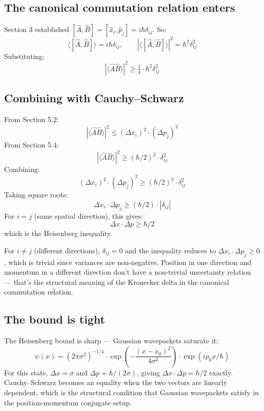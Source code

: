 \documentclass[11pt,a4paper]{article}
\begin{document}
\subsection{The canonical commutation relation enters}

Section 3 established $[\hat{A}, \hat{B}] = [\hat{x}_i, \hat{p}_j] = i\hbar\delta_{ij}$. So:
\[
\langle[\hat{A}, \hat{B}]\rangle = i\hbar\delta_{ij}, \qquad |\langle[\hat{A}, \hat{B}]\rangle|^{2} = \hbar^{2}\delta_{ij}^{2}
\]
Substituting:
\[
|\langle\hat{A}\hat{B}\rangle|^{2} \geq \tfrac{1}{4}\cdot\hbar^{2}\delta_{ij}^{2}
\]

\subsection{Combining with Cauchy--Schwarz}

From Section 5.2:
\[
|\langle\hat{A}\hat{B}\rangle|^{2} \leq (\Delta x_i)^{2}\cdot(\Delta p_j)^{2}
\]
From Section 5.4:
\[
|\langle\hat{A}\hat{B}\rangle|^{2} \geq (\hbar/2)^{2}\cdot\delta_{ij}^{2}
\]
Combining:
\[
(\Delta x_i)^{2}\cdot(\Delta p_j)^{2} \geq (\hbar/2)^{2}\cdot\delta_{ij}^{2}
\]
Taking square roots:
\[
\Delta x_i\cdot\Delta p_j \geq (\hbar/2)\cdot|\delta_{ij}|
\]
For $i = j$ (same spatial direction), this gives:
\[
\Delta x\cdot\Delta p \geq \hbar/2
\]
which is the Heisenberg inequality.

For $i \neq j$ (different directions), $\delta_{ij} = 0$ and the inequality reduces to $\Delta x_i\cdot\Delta p_j \geq 0$, which is trivial since variances are non-negative. Position in one direction and momentum in a different direction don't have a non-trivial uncertainty relation --- that's the structural meaning of the Kronecker delta in the canonical commutation relation.

\subsection{The bound is tight}

The Heisenberg bound is sharp --- Gaussian wavepackets saturate it:
\[
\psi(x) = (2\pi\sigma^{2})^{-1/4}\cdot\exp\!\left(-\frac{(x - x_0)^{2}}{4\sigma^{2}}\right)\cdot\exp(ip_0 x/\hbar)
\]
For this state, $\Delta x = \sigma$ and $\Delta p = \hbar/(2\sigma)$, giving $\Delta x\cdot\Delta p = \hbar/2$ exactly. Cauchy--Schwarz becomes an equality when the two vectors are linearly dependent, which is the structural condition that Gaussian wavepackets satisfy in the position-momentum conjugate setup.
\end{document}
